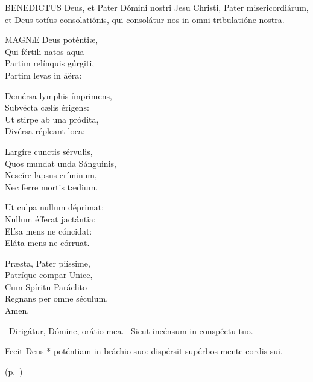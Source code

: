 


\lettrine[lines=2]{B}{ENEDICTUS} Deus, et Pater Dómini nostri Jesu Christi, Pater misericordiárum, et Deus totíus consolatiónis, qui consolátur nos in omni tribulatióne nostra.


\lettrine[lines=2]{M}{AGNÆ} Deus poténtiæ,\\
Qui fértili natos aqua\\
Partim relínquis gúrgiti,\\
Partim levas in áëra:

Demérsa lymphis ímprimens,\\
Subvécta cælis érigens:\\
Ut stirpe ab una pródita,\\
Divérsa répleant loca:

Largíre cunctis sérvulis,\\
Quos mundat unda Sánguinis,\\
Nescíre lapsus críminum,\\
Nec ferre mortis tædium.

Ut culpa nullum déprimat:\\
Nullum éfferat jactántia:\\
Elísa mens ne cóncidat:\\
Eláta mens ne córruat.

Præsta, Pater piíssime,\\
Patríque compar Unice,\\
Cum Spíritu Paráclito\\
Regnans per omne séculum.\\
Amen.

\V\ Dirigátur, Dómine, orátio mea. \R\ Sicut incénsum in conspéctu tuo.


 Fecit Deus * poténtiam in bráchio suo: dispérsit supérbos mente cordis sui.

 (p.~\pageref{feria5:precesferialesvesperas})


\sectionornament

